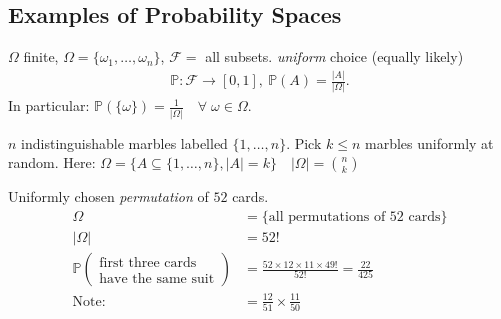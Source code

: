 \subsection{Examples of Probability Spaces}

\begin{example}
    $\Omega$ finite, $\Omega = \{\omega_1, \dots, \omega_n\}$, $\mathcal{F} =$ all subsets.
    \emph{uniform} choice (equally likely)
    \begin{align*}
        \mathbb{P} : \mathcal{F} \to [0, 1],\ \mathbb{P}(A) = \frac{|A|}{|\Omega|}.
    \end{align*}
    In particular: $\mathbb{P}(\{\omega\}) = \frac{1}{|\Omega|} \quad \forall \;\omega \in \Omega$.
\end{example}

\begin{example}
    $n$ indistinguishable marbles labelled $\{1, \dots, n\}$.
    Pick $k \leq n$ marbles uniformly at random.
    Here: $\Omega = \{A \subseteq \{1, \dots, n\}, |A| = k\} \quad |\Omega| = \binom{n}{k}$
\end{example}

\begin{example}
    Uniformly chosen \emph{permutation} of $52$ cards.
    \begin{align*}
        \Omega &= \{ \text{all permutations of 52 cards} \} \\
        |\Omega| &= 52! \\
        \mathbb{P}(\substack{\text{first three cards} \\ \text{have the same suit}}) &= \frac{52 \times 12 \times 11 \times 49!}{52!} = \frac{22}{425} \\
        \text{Note:} &= \frac{12}{51} \times \frac{11}{50}
    \end{align*}
\end{example}

